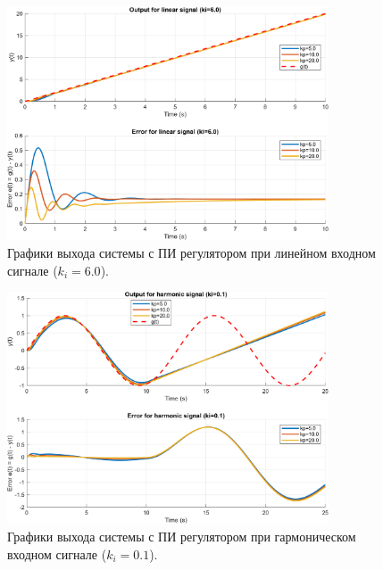 \begin{figure}[H]
    \centering
    \includegraphics[width=0.85\textwidth]{figs/task_5_out_linear_ki6.0.png}
    \caption{Графики выхода системы с ПИ регулятором при линейном входном сигнале (\( k_i = 6.0 \)).}
    \label{fig:task_5_out_linear_ki6.0}
\end{figure}

\begin{figure}[H]
    \centering
    \includegraphics[width=0.85\textwidth]{figs/task_5_out_harmonic_ki0.1.png}
    \caption{Графики выхода системы с ПИ регулятором при гармоническом входном сигнале (\( k_i = 0.1 \)).}
    \label{fig:task_5_out_harmonic_ki0.1}
\end{figure}

